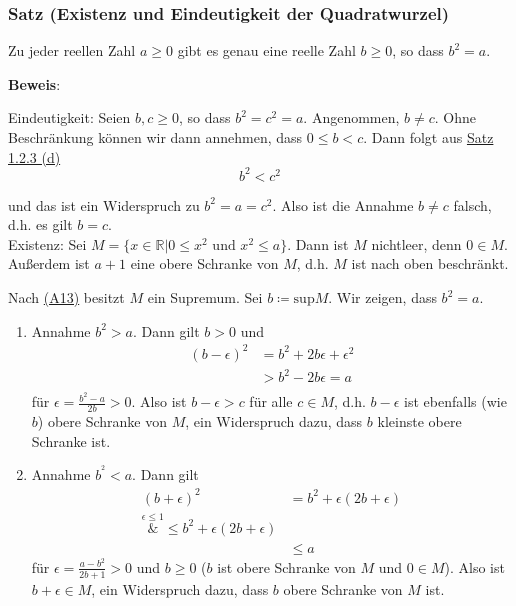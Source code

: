 \documentclass{article}
\begin{document}
\subsubsection{Satz (Existenz und Eindeutigkeit der Quadratwurzel)}

Zu jeder reellen Zahl $a \geq 0$ gibt es genau eine reelle Zahl $b \geq 0$, so dass $b^2 = a$.


\noindent
\textbf{Beweis}:

Eindeutigkeit: Seien $b, c \geq 0$, so dass $b^2 = c^2 = a$. Angenommen, $b \ne c$. Ohne Beschränkung können wir dann
annehmen, dass $0 \leq b < c$. Dann folgt aus \hyperref[sec:1.2.3_d]{Satz 1.2.3 (d)}
\[
  b^2 < c^2
\]

und das ist ein Widerspruch zu $b^2 = a = c^2$.
Also ist die Annahme $b \ne c$ falsch, d.h. es gilt  $b = c$. \\

Existenz: Sei $M = \{ x \in \mathbb{R} | 0 \leq x^2 \text{ und } x^2 \leq a \}$. Dann ist $M$ nichtleer,
denn $0 \in M$.
Außerdem ist $a + 1$ eine obere Schranke von $M$, d.h. $M$ ist nach oben beschränkt.

Nach \hyperref[axiom:13]{(A13)} besitzt $M$ ein Supremum. Sei $b \coloneqq \text{sup}M$.
Wir zeigen, dass $b^2 = a$.

\begin{enumerate}[1.]
\item Annahme $b^2 > a$. Dann gilt $b > 0$ und
  \begin{align*}
    (b - \epsilon)^2 &= b^2 + 2b\epsilon + \epsilon^2 \\
                     &> b^2 - 2b\epsilon = a\\
  \end{align*}
  für $\epsilon = \frac{b^2 - a}{2b} > 0$.
  Also ist $b - \epsilon > c$ für alle $c \in M$, d.h. $b - \epsilon$ ist ebenfalls (wie $b$) obere
  Schranke von $M$, ein Widerspruch dazu, dass $b$ kleinste obere Schranke ist.
\item Annahme $b^^2 < a$. Dann gilt
  \begin{align*}
    (b + \epsilon)^2 &= b^2 + \epsilon(2b + \epsilon) \\
    \overset{\epsilon \leq 1}&{\leq} b^2 + \epsilon(2b + \epsilon) \\
                     &\leq a
  \end{align*}
  für $\epsilon = \frac{a - b^2}{2b + 1} > 0$ und $b \geq 0$ ($b$ ist obere Schranke von $M$ und $0 \in M$).
  Also ist $b + \epsilon \in M$, ein Widerspruch dazu, dass $b$ obere Schranke von $M$ ist.
\end{enumerate}
\end{document}
